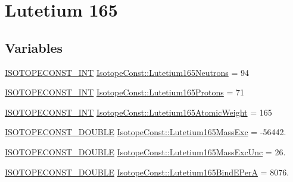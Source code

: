 \hypertarget{group___isotope_const-_lutetium-_lu165}{}\section{Lutetium 165}
\label{group___isotope_const-_lutetium-_lu165}
\subsection*{Variables}
\begin{DoxyCompactItemize}
\item 
\mbox{\hyperlink{group___isotope_const-_macros_ga5f18360b3e99483a35c32d789e62621c}{I\+S\+O\+T\+O\+P\+E\+C\+O\+N\+S\+T\+\_\+\+I\+NT}} \mbox{\hyperlink{group___isotope_const-_lutetium-_lu165_ga4929e2424469e4009cd857212b9e998f}{Isotope\+Const\+::\+Lutetium165\+Neutrons}} = 94
\item 
\mbox{\hyperlink{group___isotope_const-_macros_ga5f18360b3e99483a35c32d789e62621c}{I\+S\+O\+T\+O\+P\+E\+C\+O\+N\+S\+T\+\_\+\+I\+NT}} \mbox{\hyperlink{group___isotope_const-_lutetium-_lu165_gae50db69af75e5dd7d0125fc6584a7b88}{Isotope\+Const\+::\+Lutetium165\+Protons}} = 71
\item 
\mbox{\hyperlink{group___isotope_const-_macros_ga5f18360b3e99483a35c32d789e62621c}{I\+S\+O\+T\+O\+P\+E\+C\+O\+N\+S\+T\+\_\+\+I\+NT}} \mbox{\hyperlink{group___isotope_const-_lutetium-_lu165_gac38728be9328f273e8bd59e74cf05598}{Isotope\+Const\+::\+Lutetium165\+Atomic\+Weight}} = 165
\item 
\mbox{\hyperlink{group___isotope_const-_macros_ga8f45a7272ce02c0b4c65c44636ed719a}{I\+S\+O\+T\+O\+P\+E\+C\+O\+N\+S\+T\+\_\+\+D\+O\+U\+B\+LE}} \mbox{\hyperlink{group___isotope_const-_lutetium-_lu165_ga349d69010512be9166f72fa087483337}{Isotope\+Const\+::\+Lutetium165\+Mass\+Exc}} = -\/56442.
\item 
\mbox{\hyperlink{group___isotope_const-_macros_ga8f45a7272ce02c0b4c65c44636ed719a}{I\+S\+O\+T\+O\+P\+E\+C\+O\+N\+S\+T\+\_\+\+D\+O\+U\+B\+LE}} \mbox{\hyperlink{group___isotope_const-_lutetium-_lu165_ga4729d14912ed6e419900e95893a93814}{Isotope\+Const\+::\+Lutetium165\+Mass\+Exc\+Unc}} = 26.
\item 
\mbox{\hyperlink{group___isotope_const-_macros_ga8f45a7272ce02c0b4c65c44636ed719a}{I\+S\+O\+T\+O\+P\+E\+C\+O\+N\+S\+T\+\_\+\+D\+O\+U\+B\+LE}} \mbox{\hyperlink{group___isotope_const-_lutetium-_lu165_ga502d53c557f720f4a093b6101be2e262}{Isotope\+Const\+::\+Lutetium165\+Bind\+E\+PerA}} = 8076.
\item 

\end{DoxyCompactItemize}
